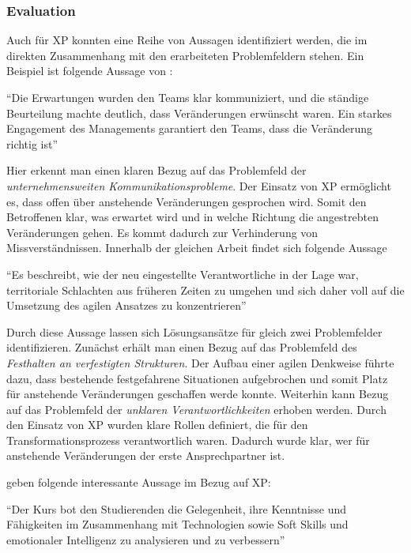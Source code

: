 \subsubsection{Evaluation}

Auch für XP konnten eine Reihe von Aussagen identifiziert werden, die im direkten Zusammenhang mit den erarbeiteten Problemfeldern stehen. Ein Beispiel ist folgende Aussage von :

\begin{center}
	``Die Erwartungen wurden den Teams klar kommuniziert, und die ständige Beurteilung machte deutlich, dass Veränderungen erwünscht waren. Ein starkes Engagement des Managements garantiert den Teams, dass die Veränderung richtig ist'' \cite[S. 15]{dikert_challenges_2016}
\end{center}

Hier erkennt man einen klaren Bezug auf das Problemfeld der \textit{unternehmensweiten Kommunikationsprobleme}. Der Einsatz von XP ermöglicht es, dass offen über anstehende Veränderungen gesprochen wird. Somit den Betroffenen klar, was erwartet wird und in welche Richtung die angestrebten Veränderungen gehen. Es kommt dadurch zur Verhinderung von Missverständnissen. Innerhalb der gleichen Arbeit findet sich folgende Aussage

\begin{center}
	``Es beschreibt, wie der neu eingestellte Verantwortliche in der Lage war, territoriale Schlachten aus früheren Zeiten zu umgehen und sich daher voll auf die Umsetzung des agilen Ansatzes zu konzentrieren'' \cite[S. 15]{dikert_challenges_2016}
\end{center}

Durch diese Aussage lassen sich Lösungsansätze für gleich zwei Problemfelder identifizieren. Zunächst erhält man einen Bezug auf das Problemfeld des \textit{Festhalten an verfestigten Strukturen}. Der Aufbau einer agilen Denkweise führte dazu, dass bestehende festgefahrene Situationen aufgebrochen und somit Platz für anstehende Veränderungen geschaffen werde konnte. Weiterhin kann Bezug auf das Problemfeld der \textit{unklaren Verantwortlichkeiten} erhoben werden. Durch den Einsatz von XP wurden klare Rollen definiert, die für den Transformationsprozess verantwortlich waren. Dadurch wurde klar, wer für anstehende Veränderungen der erste Ansprechpartner ist.

 geben folgende interessante Aussage im Bezug auf XP:

\begin{center}
	``Der Kurs bot den Studierenden die Gelegenheit, ihre Kenntnisse und Fähigkeiten im Zusammenhang mit Technologien sowie Soft Skills und emotionaler Intelligenz zu analysieren und zu verbessern'' \cite[S. 6]{shahzad_training_nodate}
\end{center}

